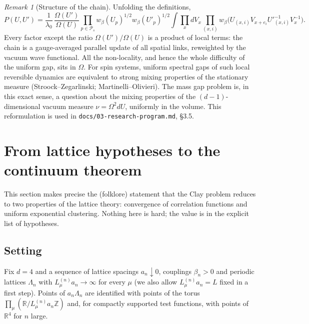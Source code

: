 \documentclass[11pt,a4paper]{article}
\theoremstyle{definition}
\theoremstyle{remark}
\newtheorem{remark}[theorem]{Remark}
\newcommand{\R}{\mathbb{R}}
\newcommand{\Z}{\mathbb{Z}}
\newcommand{\cP}{\mathcal{P}}
\begin{document}
\begin{remark}[Structure of the chain]\label{rem:chain}
Unfolding the definitions,
\[
P(U,U')=\frac{1}{\lambda_0}\,\frac{\Omega(U')}{\Omega(U)}\prod_{p\in\cP_s}w_\beta(U_p)^{1/2}w_\beta(U'_p)^{1/2}
\int\prod_xdV_x\prod_{(x,i)}w_\beta\bigl(U_{(x,i)}V_{x+e_i}U'^{-1}_{(x,i)}V_x^{-1}\bigr).
\]
Every factor except the ratio $\Omega(U')/\Omega(U)$ is a product of local terms: the chain is a gauge-averaged
parallel update of all spatial links, reweighted by the vacuum wave functional. All the non-locality, and hence
the whole difficulty of the uniform gap, sits in $\Omega$. For spin systems, uniform spectral gaps of such local
reversible dynamics are equivalent to strong mixing properties of the stationary measure (Stroock--Zegarlinski;
Martinelli--Olivieri). The mass gap problem is, in this exact sense, a question about the mixing properties of the
$(d-1)$-dimensional vacuum measure $\nu=\Omega^2dU$, uniformly in the volume. This reformulation is used in
\texttt{docs/03-research-program.md}, \S3.5.
\end{remark}

\section{From lattice hypotheses to the continuum theorem}\label{sec:reduction}

This section makes precise the (folklore) statement that the Clay problem reduces to two properties of the
lattice theory: convergence of correlation functions and uniform exponential clustering. Nothing here is hard;
the value is in the explicit list of hypotheses.

\subsection{Setting}

Fix $d=4$ and a sequence of lattice spacings $a_n\downarrow0$, couplings $\beta_n>0$ and periodic lattices
$\Lambda_n$ with $L^{(n)}_\mu a_n\to\infty$ for every $\mu$ (we also allow $L^{(n)}_\mu a_n=L$ fixed in a first step).
Points of $a_n\Lambda_n$ are identified with points of the torus $\prod_\mu(\R/L^{(n)}_\mu a_n\Z)$ and, for
compactly supported test functions, with points of $\R^4$ for $n$ large.
\end{document}
